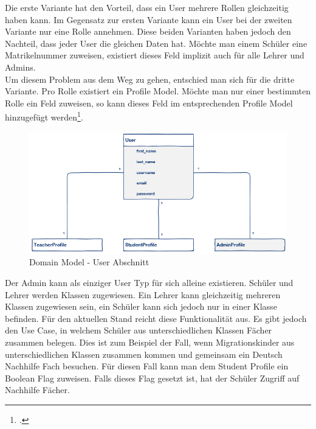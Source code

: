 Die erste Variante hat den Vorteil, dass ein User mehrere Rollen gleichzeitig haben kann. Im Gegensatz zur ersten Variante kann ein User bei der zweiten Variante nur eine Rolle annehmen. Diese beiden Varianten haben jedoch den Nachteil, dass jeder User die gleichen Daten hat. Möchte man einem Schüler eine Matrikelnummer zuweisen, existiert dieses Feld implizit auch für alle Lehrer und Admins. \\
Um diesem Problem aus dem Weg zu gehen, entschied man sich für die dritte Variante. Pro Rolle existiert ein Profile Model. Möchte man nur einer bestimmten Rolle ein Feld zuweisen, so kann dieses Feld im entsprechenden Profile Model hinzugefügt werden\footcite{django:user_types}. \\

\begin{figure}[H]
	\begin{center}
	\includegraphics[width=\textwidth, keepaspectratio]{images/domain_model_user.png}
	\caption{Domain Model - User Abschnitt}
	\label{fig:domain_model_user}
	\end{center}
\end{figure}

Der Admin kann als einziger User Typ für sich alleine existieren. Schüler und Lehrer werden Klassen zugewiesen. Ein Lehrer kann gleichzeitig mehreren Klassen zugewiesen sein, ein Schüler kann sich jedoch nur in einer Klasse befinden. Für den aktuellen Stand reicht diese Funktionalität aus. Es gibt jedoch den Use Case, in welchem Schüler aus unterschiedlichen Klassen Fächer zusammen belegen. Dies ist zum Beispiel der Fall, wenn Migrationskinder aus unterschiedlichen Klassen zusammen kommen und gemeinsam ein Deutsch Nachhilfe Fach besuchen. Für diesen Fall kann man dem Student Profile ein Boolean Flag zuweisen. Falls dieses Flag gesetzt ist, hat der Schüler Zugriff auf Nachhilfe Fächer. \\

